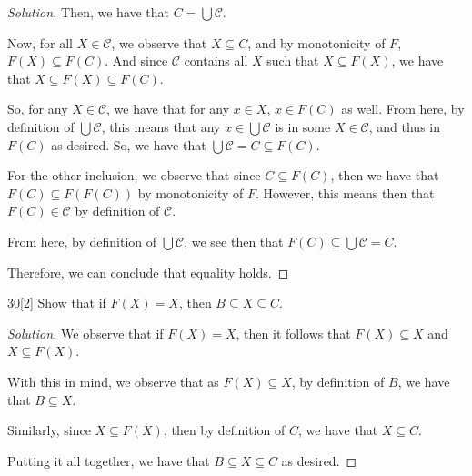 \documentclass{article}
\newenvironment{solution}{\begin{proof}[Solution]}{\end{proof}}
\renewcommand\qedsymbol{$\blacksquare$}
\newenvironment{innerproof}{\renewcommand{\qedsymbol}{$\square$}\proof}{\endproof}
\begin{document}
\begin{solution}
\begin{innerproof}
			Then, we have that $C = \bigcup \mathcal C$.
			
			Now, for all $X \in \mathcal C$, we observe that $X \subseteq C$, and by monotonicity of $F$, $F(X) \subseteq F(C)$. And since $\mathcal C$ contains all $X$ such that $X \subseteq F(X)$, we have that $X \subseteq F(X) \subseteq F(C)$.
			
			So, for any $X \in \mathcal C$, we have that for any $x \in X$, $x \in F(C)$ as well. From here, by definition of $\bigcup \mathcal C$, this means that any $x \in \bigcup\mathcal C$ is in some $X \in \mathcal C$, and thus in $F(C)$ as desired. So, we have that $\bigcup \mathcal C = C \subseteq F(C)$.
			
			For the other inclusion, we observe that since $C \subseteq F(C)$, then we have that $F(C) \subseteq F(F(C))$ by monotonicity of $F$. However, this means then that $F(C) \in \mathcal C$ by definition of $\mathcal C$.
			
			From here, by definition of $\bigcup \mathcal C$, we see then that $F(C) \subseteq \bigcup \mathcal C = C$.
			
			Therefore, we can conclude that equality holds.
		\end{innerproof}
	\end{solution}
	
	\begin{hw}{30}[2]
		Show that if $F(X) = X$, then $B \subseteq X \subseteq C$.
	\end{hw}
	\begin{solution}
		We observe that if $F(X) = X$, then it follows that $F(X) \subseteq X$ and $X \subseteq F(X)$.
		
		With this in mind, we observe that as $F(X) \subseteq X$, by definition of $B$, we have that $B \subseteq X$.
		
		Similarly, since $X \subseteq F(X)$, then by definition of $C$, we have that $X \subseteq C$.
		
		Putting it all together, we have that $B \subseteq X \subseteq C$ as desired.
	\end{solution}
\end{document}
